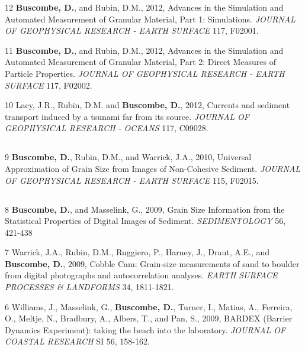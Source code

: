 \documentclass[margin,line]{resume}
\begin{document}
\begin{resume}
\begin{footnotesize}
\begin{list1}
	\item[12] {\bf Buscombe, D.}, and Rubin, D.M., 2012, Advances in the Simulation and Automated Measurement of Granular Material, Part 1: Simulations. {\sl JOURNAL OF GEOPHYSICAL RESEARCH - EARTH SURFACE} 117, F02001.\\

	\item[11] {\bf Buscombe, D.}, and Rubin, D.M., 2012, Advances in the Simulation and Automated Measurement of Granular Material, Part 2: Direct Measures of Particle Properties. {\sl JOURNAL OF GEOPHYSICAL RESEARCH - EARTH SURFACE} 117, F02002.\\

	\item[10] Lacy, J.R., Rubin, D.M. and {\bf Buscombe, D.}, 2012, Currents and sediment transport induced by a tsunami far from its source. {\sl JOURNAL OF GEOPHYSICAL RESEARCH - OCEANS} 117, C09028.
	\end{list1}

	\subsection{}
	\begin{list1}
	\item[9] {\bf Buscombe, D.}, Rubin, D.M., and Warrick, J.A., 2010, Universal Approximation of Grain Size from Images of Non-Cohesive Sediment. {\sl JOURNAL OF GEOPHYSICAL RESEARCH - EARTH SURFACE} 115, F02015.
	\end{list1}
	
	\subsection{}
	\begin{list1}
	\item[8] {\bf Buscombe, D.}, and Masselink, G., 2009, Grain Size Information from the Statistical Properties of Digital Images of Sediment. {\sl SEDIMENTOLOGY} 56, 421-438 \\

	\item[7] Warrick, J.A., Rubin, D.M., Ruggiero, P., Harney, J., Draut, A.E., and {\bf Buscombe, D.}, 2009, Cobble Cam: Grain-size measurements of sand to boulder from digital photographs and autocorrelation analyses. {\sl EARTH SURFACE PROCESSES \& LANDFORMS} 34, 1811-1821.\\

	\item[6] Williams, J., Masselink, G., {\bf Buscombe, D.}, Turner, I., Matias, A., Ferreira, O., Meltje, N., Bradbury, A., Albers, T., and Pan, S., 2009, BARDEX (Barrier Dynamics Experiment): taking the beach into the laboratory. {\sl JOURNAL OF COASTAL RESEARCH} SI 56, 158-162.
	\end{list1}
	

\end{footnotesize}
\end{resume}
\end{document}
